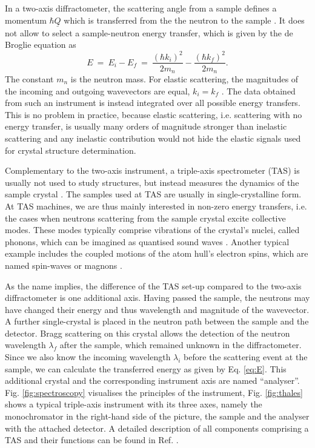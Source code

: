 In a two-axis diffractometer, the scattering angle from a sample defines a momentum $\hbar \underline{Q}$ which is
transferred from the the neutron to the sample \cite[p. 11]{Shirane2002}.
It does not allow to select a sample-neutron energy transfer, which is given by the de Broglie equation
as \cite[p. 89]{Gross2012} \cite[p. 11]{Shirane2002}
\begin{equation}
	\label{eq:E}
	E \ =\ E_i - E_f \ =\ \frac{\left( \hbar k_i \right)^2}{2 m_n} - \frac{\left( \hbar k_f \right)^2}{2 m_n}.
\end{equation}
The constant $m_n$ is the neutron mass. For elastic scattering, the magnitudes of
the incoming and outgoing wavevectors are equal, $k_i = k_f$ \cite[p. 14]{Shirane2002}.
The data obtained from such an instrument is instead integrated over all possible energy transfers.
This is no problem in practice, because elastic scattering, i.e. scattering with no energy transfer,
is usually many orders of magnitude stronger than inelastic scattering and any inelastic contribution
would not hide the elastic signals used for crystal structure determination.

Complementary to the two-axis instrument, a triple-axis spectrometer (TAS) is usually not used to study structures,
but instead measures the dynamics of the sample crystal \cite[pp. 214-215]{Gross2012}.
The samples used at TAS are usually in single-crystalline form.
At TAS machines, we are thus mainly interested in non-zero energy transfers, i.e. the cases when neutrons scattering from the
sample crystal excite collective modes. These modes typically comprise vibrations of the crystal's nuclei, called phonons,
which can be imagined as quantised sound waves \cite[pp. 123-137]{Shirane2002}. Another typical example includes the
coupled motions of the atom hull's electron spins, which are named spin-waves or magnons \cite[pp. 137-144]{Shirane2002}.

As the name implies, the difference of the TAS set-up compared to the two-axis diffractometer is one additional axis.
Having passed the sample, the neutrons may have changed their energy and thus wavelength and magnitude of the wavevector.
A further single-crystal is placed in the neutron path between the sample and the detector. Bragg scattering on this crystal
allows the detection of the neutron wavelength $\lambda_f$ after the sample, which remained unknown in the diffractometer.
Since we also know the incoming wavelength $\lambda_i$ before the scattering event at the sample, we can calculate the
transferred energy as given by Eq. \ref{eq:E}. This additional crystal and the corresponding instrument axis are named ``analyser''.
Fig. \ref{fig:spectroscopy} visualises the principles of the instrument, Fig. \ref{fig:thales} shows a typical triple-axis
instrument with its three axes, namely the monochromator in the right-hand side of the picture, the sample and the analyser
with the attached detector. A detailed description of all components comprising a TAS and their functions can be found
in Ref. \cite[pp. 55-93]{Shirane2002}.

